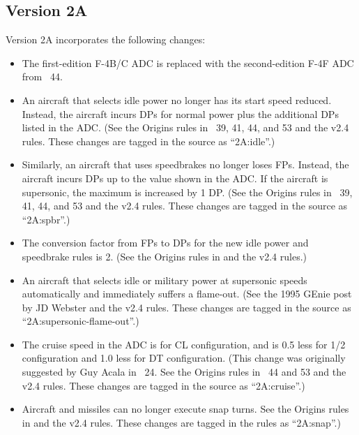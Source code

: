\documentclass[10pt]{article}
\begin{document}
\subsection{Version 2A}

Version 2A incorporates the following changes:

\begin{itemize}

    \item The first-edition F-4B/C ADC is replaced with the second-edition F-4F ADC from {\APJ}~44.

    \item An aircraft that selects idle power no longer has its start speed reduced. Instead, the aircraft incurs DPs for normal power plus the additional DPs listed in the ADC. (See the Origins rules in {\APJ}~39, 41, 44, and 53 and the v2.4 rules. These changes are tagged in the source as “2A:idle”.) 

    \item Similarly, an aircraft that uses speedbrakes no longer loses FPs. Instead, the aircraft incurs DPs up to the value shown in the ADC. If the aircraft is supersonic, the maximum is increased by 1 DP. (See the Origins rules in {\APJ}~39, 41, 44, and 53 and the v2.4 rules. These changes are tagged in the source as “2A:spbr”.) 

    \item The conversion factor from FPs to DPs for the new idle power and speedbrake rules is 2. (See the Origins rules in {} and the v2.4 rules.)

    \item An aircraft that selects idle or military power at supersonic speeds automatically and immediately suffers a flame-out. (See the 1995 GEnie post by JD Webster and the v2.4 rules. These changes are tagged in the source as “2A:supersonic-flame-out”.)

    \item The cruise speed in the ADC is for CL configuration, and is 0.5 less for 1/2 configuration and 1.0 less for DT configuration. (This change was originally suggested by Guy Acala in {\APJ}~24. See the Origins rules in {\APJ}~44 and 53 and the v2.4 rules. These changes are tagged in the source as “2A:cruise”.) 

    \item Aircraft and missiles can no longer execute snap turns. See the Origins rules in {} and the v2.4 rules. These changes are tagged in the rules as “2A:snap”.)


\end{itemize}
\end{document}
